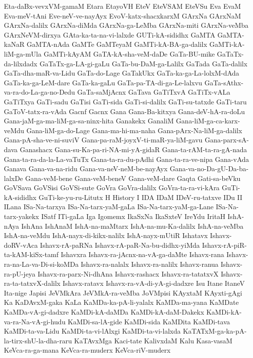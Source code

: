 {Eta-daBx-vevxVM-gamaM
Etara
EtayoVH
EteV
EteVSAM
EteVSu
Eva
EvaM
Eva-meV-tAni
Eve-neV-ve-nayAyx
EvoV-katx-shacxkarxM
GArxNa
GArxNaM
GArxNa-dalilx
GArxNa-diMda
GArxNa-ga-LeMba
GArxNa-miti
GArxNa-veMba
GArxNeVM-dirxya
GAta-ka-ta-na-vi-lalxde
GUTi-kA-sididhx
GaMTA
GaMTA-kaNaR
GaMTA-nAda
GaMTe
GaMTeyaM
GaMTi-kA-BA-ga-dalilx
GaMTi-kA-liM-ga-mUla
GaMTi-kAyAM
GaTA-kA-sha-veM-daDe
GaTa-BU-mike
GaTaTx-da-lilxdadx
GaTaTx-ga-LA-gi-gaLu
GaTa-bu-DaM-ga-Lalilx
GaTada
GaTa-dalilx
GaTa-dha-maR-va-Lidu
GaTa-do-Lage
GaTakUkx
GaTa-ka-ga-La-lolxM-dAda
GaTa-ka-ga-LeM-dare
GaTa-ka-gaLu
GaTa-pa-TA-di-ga-Le-lalxvu
GaTa-sAthx-va-ra-do-La-ga-no-Dedu
GaTa-saMjAcnx
GaTava
GaTiTxvA
GaTiTx-vALa
GaTiTxya
GaTi-sadu
GaTisi
GaTi-sida
GaTi-si-dalilx
GaTi-su-tatxde
GaTi-taru
GaToV-tatx-ra-vAda
Gacnf
Gacnx
Gana
Gana-Ba-kitxya
Gana-deV-hA-ra-doLu
Gana-jaM-ga-ma-liM-ga-sa-ninx-hita
Ganakekx
GanaliM
Gana-liM-ga-ca-karx-veMdu
Gana-liM-ga-do-Lage
Gana-ma-hi-ma-naha
Gana-pArx-Na-liM-ga-dalilx
Gana-pA-sha-ve-ni-suviV
Gana-pa-raM-joyxV-ti-maR-ya-liM-gavu
Gana-parx-sA-dava
Ganashacx
Gana-su-Ka-pa-ri-NA-mi-yA-gidaR
Gana-ta-rAM-ta-ra-gA-nada
Gana-ta-ra-da-la-La-vaTuTx
Gana-ta-ra-du-pAdhi
Gana-ta-ra-ve-nipa
Gana-vAda
Ganava
Gana-va-na-ridu
Gana-va-neV-neM-be-nayAyx
Gana-va-no-Da-gU-Da-ba-lalxDe
Gana-veM-bene
Gana-veM-beneV
Gana-veM-dare
Gaqta
Gati-sa-beVku
GoVSava
GoVSisi
GoVSi-sute
GoVra
GoVra-dalilx
GoVra-ta-ra-vi-kAra
GuTi-kA-sididhx
GuTi-ke-yu-ru-Litutx
H
History
I
IDA
IDaM
IDeV-ru-tatxve
IDu
II
ILana
ISa-Na-tarxya
ISa-Na-tarx-yaM-gaLa
ISa-Na-tarx-yaM-ga-Lane
ISa-Na-tarx-yakekx
ISatf
ITi-gaLa
Iga
Igomemx
IkaSxNa
IkaSxteV
IreYdu
IritaH
IshA-nAya
IshAna
IshAnaM
IshA-na-maMtarx
IshA-na-mu-Ka-dalilx
IshA-na-veMba
IshA-na-veMdu
IshA-nayx-di-kikx-nalilx
IshA-nayx-mUtiR
Ishatavx
Ishavx-doRV-vAca
Ishavx-rA-paRNa
Ishavx-rA-paR-Na-bu-didhx-yiMda
Ishavx-rA-piR-ta-kAM-kiSx-tamf
Ishavxra
Ishavx-ra-jAcnx-na-vA-ga-daMte
Ishavx-rana
Ishavx-ra-na-La-va-Di-si-koMDa
Ishavx-ra-nalalx
Ishavx-ra-nalilx
Ishavx-ranua
Ishavx-ra-pU-jeya
Ishavx-ra-parx-Ni-dhAna
Ishavx-rashacx
Ishavx-ra-tatatxvX
Ishavx-ra-ta-tatxvX-dalilx
Ishavx-ratavx
Ishavx-ra-vA-di-yA-gi-dadxre
Isu
Itane
ItaneV
Ita-nige
Japisi
JeVMkAra
JeVMkA-ra-veMba
JoVMpisi
KAyxtaM
KAyxti-gAgi
Ka
KaDAvxM-gaka
KaLa
KaMDa-ka-pA-li-yalalx
KaMDa-ma-yana
KaMDate
KaMDa-vA-gi-dadxre
KaMDi-kA-daMDa
KaMDi-kA-daM-Dakekx
KaMDi-kA-va-ra-Na-vA-gi-hudu
KaMDi-sa-lA-gide
KaMDi-sida
KaMDita
KaMDi-tava
KaMDi-ta-va-Lidu
KaMDi-ta-vi-lAlxgi
KaMDi-ta-vi-lalxda
KaTATxM-ga-ka-pA-la-tirx-shU-la-dha-raru
KaTAvxMga
Kaci-tate
KalivxdaM
Kalu
Kasa-vasaM
KeVca-ra-ga-mana
KeVca-ra-muderx
KeVca-riV-muderx
}
